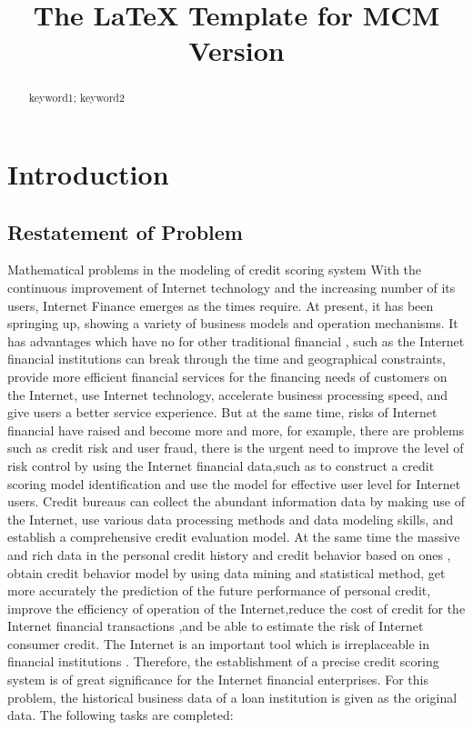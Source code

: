 \documentclass{mcmthesis}
\title{The \LaTeX{} Template for MCM Version }
\begin{document}
\begin{abstract}

\begin{keywords}
keyword1; keyword2
\end{keywords}
\end{abstract}
\maketitle
\section{Introduction}
\subsection{Restatement of Problem}
Mathematical problems in the modeling of credit scoring system
With the continuous improvement of Internet technology and the increasing number of its users, Internet Finance emerges as the times require. At present, it has been springing up, showing a variety of business models and operation mechanisms. It has advantages which have no for other traditional financial , such as the Internet financial institutions can break through the time and geographical constraints,  provide more efficient financial services for the financing needs of customers on the Internet,  use Internet technology, accelerate business processing speed, and give users a better service experience. But at the same time, risks of Internet financial have raised and become more and more, for example, there are problems such as credit risk and user fraud, there is the urgent need to improve the level of risk control by using the Internet financial data,such as to construct a credit scoring model identification and use the model for effective user level for Internet users.
Credit bureaus can collect the abundant information data by making use of  the Internet, use various data processing methods and data modeling skills, and establish a comprehensive credit evaluation model. At the same time the massive and rich data in the personal credit history and credit behavior based on ones , obtain credit behavior model by using data mining and statistical method,  get more accurately the prediction of the future performance of personal credit, improve the efficiency of operation of the Internet,reduce the cost of credit for the Internet financial transactions ,and be able to estimate the risk of Internet consumer credit. The Internet is an important tool which is irreplaceable in financial institutions . Therefore, the establishment of a precise credit scoring system is of great significance for the Internet financial enterprises. For this problem, the historical business data of a loan institution is given as the original data. The following tasks are completed:
\end{document}
